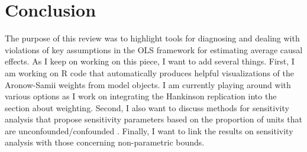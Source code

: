 \documentclass[hidelinks,11pt]{article}
\begin{document}
\section{Conclusion}

The purpose of this review was to highlight tools for diagnosing and dealing with violations of key assumptions in the OLS framework for estimating average causal effects. As I keep on working on this piece, I want to add several things. First, I am working on R code that automatically produces helpful visualizations of the Aronow-Samii weights from model objects. I am currently playing around with various options as I work on integrating the Hankinson replication into the section about weighting. Second, I also want to discuss methods for sensitivity analysis that propose sensitivity parameters based on the proportion of units that are unconfounded/confounded \citep{bonvinikennedy2021}. Finally, I want to link the results on sensitivity analysis with those concerning non-parametric bounds.


\end{document}
